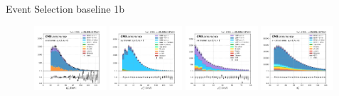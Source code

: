 \begin{frame}{Event Selection baseline 1b}
\begin{figure}
        \includegraphics[width=0.24\textwidth]{chapters/Analysis/sectionPlots/figures/kinematics_pickles/ee/1b/ee_1b_lepton2_pt.pdf}
        \includegraphics[width=0.24\textwidth]{chapters/Analysis/sectionPlots/figures/kinematics_pickles/emu2/1b/emu2_1b_lepton1_pt.pdf}
        \includegraphics[width=0.24\textwidth]{chapters/Analysis/sectionPlots/figures/kinematics_pickles/etau/1b/etau_1b_lepton2_pt.pdf}
        \includegraphics[width=0.24\textwidth]{chapters/Analysis/sectionPlots/figures/kinematics_pickles/e4j/1b/e4j_1b_lepton1_pt.pdf}
    \end{figure}
\end{frame}



